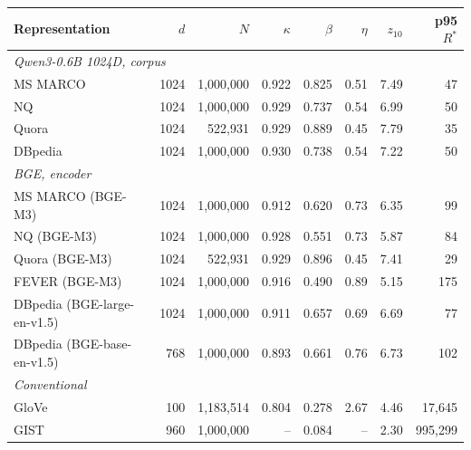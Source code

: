\begin{tabular}{lrrrrrrr}
\toprule
Representation & $d$ & $N$ & $\kappa$ & $\beta$ & $\eta$ & $z_{10}$ & p95 $R^*$ \\
\midrule
\multicolumn{8}{l}{\emph{Qwen3-0.6B 1024D, corpus}}\\
MS MARCO & 1024 & 1,000,000 & 0.922 & 0.825 & 0.51 & 7.49 & 47 \\
NQ & 1024 & 1,000,000 & 0.929 & 0.737 & 0.54 & 6.99 & 50 \\
Quora & 1024 & 522,931 & 0.929 & 0.889 & 0.45 & 7.79 & 35 \\
DBpedia & 1024 & 1,000,000 & 0.930 & 0.738 & 0.54 & 7.22 & 50 \\
\midrule
\multicolumn{8}{l}{\emph{BGE, encoder}}\\
MS MARCO (BGE-M3) & 1024 & 1,000,000 & 0.912 & 0.620 & 0.73 & 6.35 & 99 \\
NQ (BGE-M3) & 1024 & 1,000,000 & 0.928 & 0.551 & 0.73 & 5.87 & 84 \\
Quora (BGE-M3) & 1024 & 522,931 & 0.929 & 0.896 & 0.45 & 7.41 & 29 \\
FEVER (BGE-M3) & 1024 & 1,000,000 & 0.916 & 0.490 & 0.89 & 5.15 & 175 \\
DBpedia (BGE-large-en-v1.5) & 1024 & 1,000,000 & 0.911 & 0.657 & 0.69 & 6.69 & 77 \\
DBpedia (BGE-base-en-v1.5) & 768 & 1,000,000 & 0.893 & 0.661 & 0.76 & 6.73 & 102 \\
\midrule
\multicolumn{8}{l}{\emph{Conventional}}\\
GloVe & 100 & 1,183,514 & 0.804 & 0.278 & 2.67 & 4.46 & 17,645 \\
GIST & 960 & 1,000,000 & -- & 0.084 & -- & 2.30 & 995,299 \\
\bottomrule
\end{tabular}